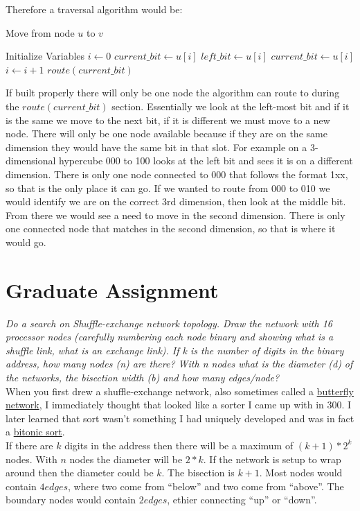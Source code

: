 \documentclass{article}
\begin{document}
\noindent Therefore a traversal algorithm would be:\\
\begin{algorithm}[H]
\caption{Move from node $u$ to $v$}
\label{alg:Prob5}
\Statex Initialize Variables
\State $i\gets 0$
\State $current\_bit\gets u[i]$
\State $left\_bit\gets u[i]$
    \State $current\_bit\gets u[i]$
        \State $i\gets i+1$
    \Else
        \State $route(current\_bit)$ 
    \EndIf
\EndWhile
\end{algorithm}

If built properly there will only be one node the algorithm can route to during the $route(current\_bit)$ section. Essentially we look at the left-most bit and if it is the same we move to the next bit, if it is different we must move to a new node. There will only be one node available because if they are on the same dimension they would have the same bit in that slot. For example on a 3-dimensional hypercube 000 to 100 looks at the left bit and sees it is on a different dimension. There is only one node connected to 000 that follows the format 1xx, so that is the only place it can go. If we wanted to route from 000 to 010 we would identify we are on the correct 3rd dimension, then look at the middle bit. From there we would see a need to move in the second dimension. There is only one connected node that matches in the second dimension, so that is where it would go.


\newpage
\section{Graduate Assignment}
\textit{Do a search on Shuffle-exchange network topology.  
Draw the network with 16 processor nodes (carefully numbering each node binary and showing what is a shuffle link, what is an exchange link).  If k is the number of digits in the binary address, how many nodes (n) are there?  With n nodes what is the diameter (d) of the networks, the bisection width (b) and how many edges/node?}\\

When you first drew a shuffle-exchange network, also sometimes called a \href{https://en.wikipedia.org/wiki/Butterfly_network}{butterfly network}, I immediately thought that looked like a sorter I came up with in 300. I later learned that sort wasn't something I had uniquely developed and was in fact a \href{https://en.wikipedia.org/wiki/Bitonic_sorter}{bitonic sort}.\\

If there are $k$ digits in the address then there will be a maximum of $(k + 1) * 2^k$ nodes. With $n$ nodes the diameter will be $2 * k$. If the network is setup to wrap around then the diameter could be $k$. The bisection is $k + 1$. Most nodes would contain $4 edges$, where two come from ``below'' and two come from ``above''. The boundary nodes would contain $2 edges$, ethier connecting ``up'' or ``down''.
\end{document}
